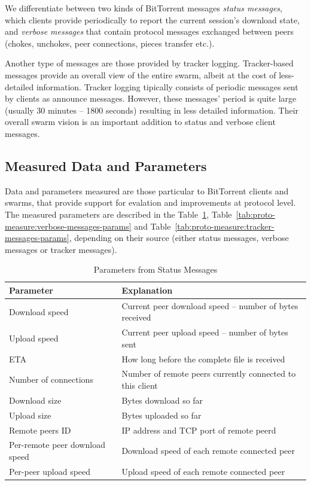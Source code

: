 We differentiate between two kinds of BitTorrent messages \textit{status
messages}, which clients provide periodically to report the current session’s
download state, and \textit{verbose messages} that contain protocol messages
exchanged between peers (chokes, unchokes, peer connections, pieces transfer
etc.).

Another type of messages are those provided by tracker logging. Tracker-based
messages provide an overall view of the entire swarm, albeit at the cost of
less-detailed information. Tracker logging tipically consists of periodic
messages sent by clients as announce messages. However, these messages' period
is quite large (usually 30 minutes -- 1800 seconds) resulting in less detailed
information. Their overall swarm vision is an important addition to status and
verbose client messages.

\subsection{Measured Data and Parameters}

Data and parameters measured are those particular to BitTorrent clients and
swarms, that provide support for evalation and improvements at protocol level.
The measured parameters are described in the
Table~\ref{tab:proto-measure:status-messages-params},
Table~\ref{tab:proto-measure:verbose-messages-params} and
Table~\ref{tab:proto-measure:tracker-messages-params}, depending
on their source (either status messages, verbose messages or tracker
messages).

\begin{table}[htb]
  \centering
  \caption{Parameters from Status Messages}
  \label{tab:proto-measure:status-messages-params}
  \begin{tabular}{@{}ll@{}}
    \toprule
      \textbf{Parameter} & \textbf{Explanation} \\
    \midrule
      Download speed & Current peer download speed -- number of bytes
      received \\
      Upload speed & Current peer upload speed -- number of bytes sent \\
      ETA & How long before the complete file is received \\
      Number of connections & Number of remote peers currently connected to
      this client \\
      Download size & Bytes download so far \\
      Upload size & Bytes uploaded so far \\
      Remote peers ID & IP address and TCP port of remote peerd \\
      Per-remote peer download speed & Download speed of each remote connected
      peer \\
      Per-peer upload speed & Upload speed of each remote connected peer \\
    \bottomrule
  \end{tabular}
\end{table}

